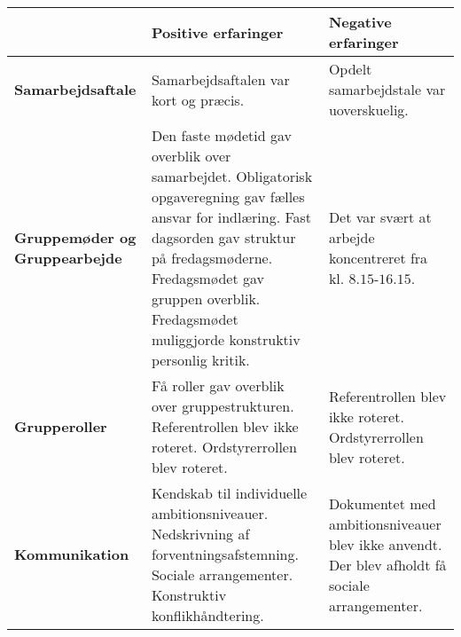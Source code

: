 \begin{table}[h]
	\caption{}
	\label{Samvur}
	\begin{tabular}{|p{3.5cm}|p{5cm}|p{5cm}|}
		
		\hline
		&\textbf{Positive erfaringer}                               &  \textbf{Negative erfaringer}                                                               \\ \hline
		\textbf{Samarbejdsaftale}          
		&  
		Samarbejdsaftalen var kort og præcis.                &  Opdelt samarbejdstale var uoverskuelig.                  \\ \hline
		\textbf{Gruppemøder og Gruppearbejde} &  
		Den faste mødetid gav overblik over samarbejdet.                                                                                                       \newline
		Obligatorisk opgaveregning gav fælles ansvar for indlæring.                                            \newline
		Fast dagsorden gav struktur på fredagsmøderne.                                                                                           \newline
		Fredagsmødet gav gruppen overblik.                                                                                        \newline
		Fredagsmødet muliggjorde konstruktiv personlig kritik.
		&   Det var svært at arbejde koncentreret fra kl. $8.15$-$16.15$.                                              \\ \hline
		\textbf{Grupperoller}                         &
		Få roller gav overblik over gruppestrukturen. \newline
		Referentrollen blev ikke roteret.                                                                                                                       \newline
		Ordstyrerrollen blev roteret.                                                                                                  \newline
		&   Referentrollen blev ikke roteret.                                                               \newline
		Ordstyrerrollen blev roteret.                                       \\ \hline
		\textbf{Kommunikation}                        &   
		Kendskab til individuelle ambitionsniveauer.     \newline
		Nedskrivning af forventningsafstemning.                                                              \newline
		Sociale arrangementer.                                                   \newline
		Konstruktiv konflikhåndtering.                                                  \newline
		&   Dokumentet med ambitionsniveauer blev ikke anvendt. \newline
		Der blev afholdt få sociale arrangementer.                                                       \newline
		\\ \hline
	\end{tabular}
\end{table}
\clearpage

